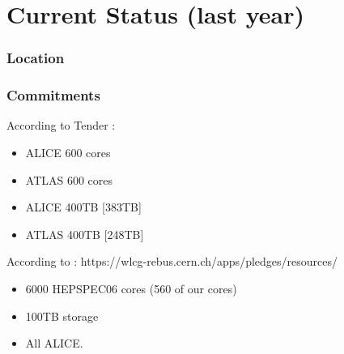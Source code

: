 \documentclass{beamer}
\begin{document}
\section{Current Status (last year)}
\begin{frame}
    \frametitle{Location}
\end{frame}
\begin{frame}
\frametitle{Commitments}
According to Tender :
\begin{itemize}
  \item ALICE 600 cores
  \item ATLAS 600 cores
  \item ALICE 400TB [383TB]
  \item ATLAS 400TB [248TB]
\end{itemize}
According to :
https://wlcg-rebus.cern.ch/apps/pledges/resources/
\begin{itemize}
  \item 6000 HEPSPEC06 cores (560 of our cores)
  \item 100TB storage
  \item All ALICE.
\end{itemize}
\end{frame}
\end{document}
